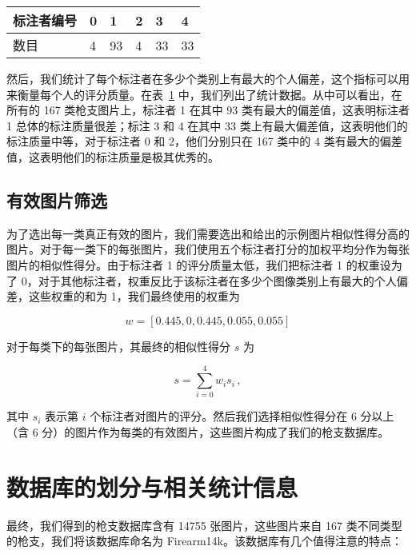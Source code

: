 \begin{table}[h]
	\centering
	\begin{tabular}{@{}llllll@{}}
		\toprule
		标注者编号	    &  0		& 1 & 2 & 3 & 4  \\
		\midrule
		数目 &  4 & 93 & 4 & 33 & 33 \\
		\bottomrule
	\end{tabular}
	\label{table:largest_devi_num}
\end{table}

然后，我们统计了每个标注者在多少个类别上有最大的个人偏差，这个指标可以用来衡量每个人的评分质量。在表~\ref{table:largest_devi_num} 中，我们列出了统计数据。从中可以看出，在所有的 167 类枪支图片上，标注者 1 在其中 93 类有最大的偏差值，这表明标注者 1 总体的标注质量很差；标注 3 和 4 在其中 33 类上有最大偏差值，这表明他们的标注质量中等，对于标注者 0 和 2，他们分别只在 167 类中的 4 类有最大的偏差值，这表明他们的标注质量是极其优秀的。

\subsection{有效图片筛选}
为了选出每一类真正有效的图片，我们需要选出和给出的示例图片相似性得分高的图片。对于每一类下的每张图片，我们使用五个标注者打分的加权平均分作为每张图片的相似性得分。由于标注者 1 的评分质量太低，我们把标注者 1 的权重设为了 0，对于其他标注者，权重反比于该标注者在多少个图像类别上有最大的个人偏差，这些权重的和为 1，我们最终使用的权重为

 \[w = [0.445, 0, 0.445, 0.055, 0.055]\]

\noindent 对于每类下的每张图片，其最终的相似性得分 $s$ 为

\begin{equation}
s = \sum_{i=0}^{4}w_{i}s_{i}\, ,
\end{equation}

\noindent 其中 $s_i$ 表示第 $i$ 个标注者对图片的评分。然后我们选择相似性得分在 6 分以上（含 6 分）的图片作为每类的有效图片，这些图片构成了我们的枪支数据库。

\section{数据库的划分与相关统计信息}\label{sec:dataset_stats}
最终，我们得到的枪支数据库含有 14755 张图片，这些图片来自 167 类不同类型的枪支，我们将该数据库命名为 Firearm14k。该数据库有几个值得注意的特点：

